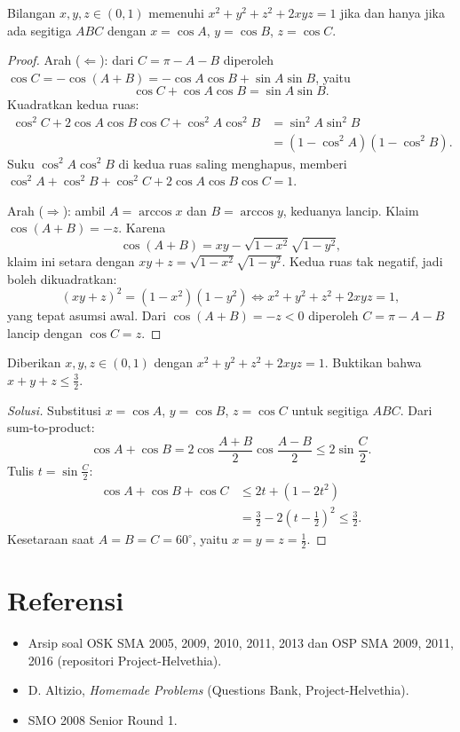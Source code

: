 \documentclass[12pt]{scrartcl}
\begin{document}
\begin{theorem}
Bilangan $x, y, z \in (0, 1)$ memenuhi $x^2 + y^2 + z^2 + 2xyz = 1$ jika dan
hanya jika ada segitiga $ABC$ dengan $x = \cos A$, $y = \cos B$, $z = \cos C$.
\end{theorem}
\begin{proof}
Arah ($\Leftarrow$): dari $C = \pi - A - B$ diperoleh
$\cos C = -\cos(A+B) = -\cos A\cos B + \sin A\sin B$, yaitu
\[ \cos C + \cos A\cos B = \sin A\sin B. \]
Kuadratkan kedua ruas:
\begin{align*}
\cos^2 C + 2\cos A\cos B\cos C + \cos^2 A\cos^2 B
&= \sin^2 A\sin^2 B \\
&= (1-\cos^2 A)(1-\cos^2 B).
\end{align*}
Suku $\cos^2 A\cos^2 B$ di kedua ruas saling menghapus, memberi
$\cos^2 A + \cos^2 B + \cos^2 C + 2\cos A\cos B\cos C = 1$.

Arah ($\Rightarrow$): ambil $A = \arccos x$ dan $B = \arccos y$, keduanya lancip.
Klaim $\cos(A+B) = -z$. Karena
\[ \cos(A+B) = xy - \sqrt{1-x^2}\sqrt{1-y^2}, \]
klaim ini setara dengan $xy + z = \sqrt{1-x^2}\sqrt{1-y^2}$.
Kedua ruas tak negatif, jadi boleh dikuadratkan:
\[ (xy+z)^2 = (1-x^2)(1-y^2) \iff x^2 + y^2 + z^2 + 2xyz = 1, \]
yang tepat asumsi awal. Dari $\cos(A+B) = -z < 0$ diperoleh
$C = \pi - A - B$ lancip dengan $\cos C = z$.
\end{proof}

\begin{example}
Diberikan $x, y, z \in (0, 1)$ dengan $x^2 + y^2 + z^2 + 2xyz = 1$.
Buktikan bahwa $x + y + z \le \frac32$.
\end{example}
\begin{proof}[Solusi]
Substitusi $x = \cos A$, $y = \cos B$, $z = \cos C$ untuk segitiga $ABC$.
Dari sum-to-product:
\[ \cos A + \cos B = 2\cos\frac{A+B}{2}\cos\frac{A-B}{2} \le 2\sin\frac{C}{2}. \]
Tulis $t = \sin\frac{C}{2}$:
\begin{align*}
\cos A + \cos B + \cos C &\le 2t + (1-2t^2) \\
&= \frac32 - 2\left(t-\frac12\right)^2 \le \frac32.
\end{align*}
Kesetaraan saat $A = B = C = 60^{\circ}$, yaitu $x = y = z = \frac12$.
\end{proof}

\section{Referensi}
\begin{itemize}
    \item Arsip soal OSK SMA 2005, 2009, 2010, 2011, 2013 dan OSP SMA 2009,
    2011, 2016 (repositori Project-Helvethia).
    \item D. Altizio, \textit{Homemade Problems} (Questions Bank, Project-Helvethia).
    \item SMO 2008 Senior Round 1.
\end{itemize}
\end{document}

